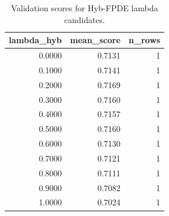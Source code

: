 \begin{table}[t]
\caption{Validation scores for Hyb-FPDE lambda candidates.}
\label{tab:lambda_distribution_computed}
\centering
\begin{tabular}{rrr}
\toprule
lambda\_hyb & mean\_score & n\_rows \\
\midrule
0.0000 & 0.7131 & 1 \\
0.1000 & 0.7141 & 1 \\
0.2000 & 0.7169 & 1 \\
0.3000 & 0.7160 & 1 \\
0.4000 & 0.7157 & 1 \\
0.5000 & 0.7160 & 1 \\
0.6000 & 0.7130 & 1 \\
0.7000 & 0.7121 & 1 \\
0.8000 & 0.7111 & 1 \\
0.9000 & 0.7082 & 1 \\
1.0000 & 0.7024 & 1 \\
\bottomrule
\end{tabular}

\end{table}
